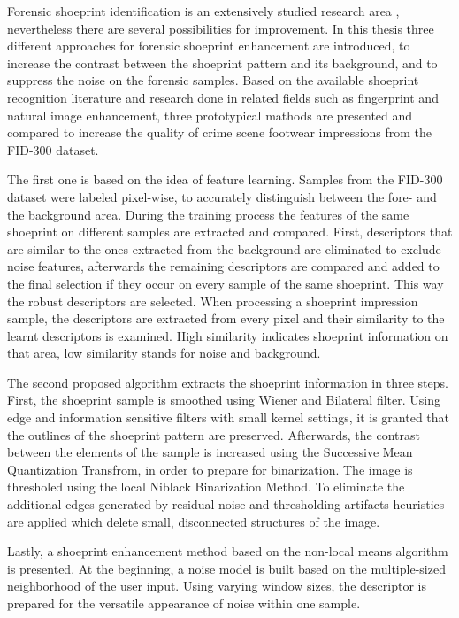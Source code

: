 \documentclass[draft,final]{vutinfth} %
\begin{document}
\par
Forensic shoeprint identification is an extensively studied research area \cite{rida2019forensic}, nevertheless there are several possibilities for improvement.
In this thesis three different approaches for forensic shoeprint enhancement are introduced, to increase the contrast between the shoeprint pattern and its background, and to suppress the noise on the forensic samples.
Based on the available shoeprint recognition literature and research done in related fields such as fingerprint and natural image enhancement, three prototypical mathods are presented and compared to increase the quality of crime scene footwear impressions from the FID-300 dataset.
\par
The first one is based on the idea of feature learning.
Samples from the FID-300 dataset were labeled pixel-wise, to accurately distinguish between the fore- and the background area.
During the training process the features of the same shoeprint on different samples are extracted and compared.
First, descriptors that are similar to the ones extracted from the background are eliminated to exclude noise features, afterwards the remaining descriptors are compared and added to the final selection if they occur on every sample of the same shoeprint.
This way the robust descriptors are selected.
When processing a shoeprint impression sample, the descriptors are extracted from every pixel and their similarity to the learnt descriptors is examined.
High similarity indicates shoeprint information on that area, low similarity stands for noise and background.
\par
The second proposed algorithm extracts the shoeprint information in three steps.
First, the shoeprint sample is smoothed using Wiener and Bilateral filter.
Using edge and information sensitive filters with small kernel settings, it is granted that the outlines of the shoeprint pattern are preserved.
Afterwards, the contrast between the elements of the sample is increased using the Successive Mean Quantization Transfrom, in order to prepare for binarization.
The image is thresholed using the local Niblack Binarization Method.
To eliminate the additional edges generated by residual noise and thresholding artifacts heuristics are applied which delete small, disconnected structures of the image.
\par
Lastly, a shoeprint enhancement method based on the non-local means algorithm is presented.
At the beginning, a noise model is built based on the multiple-sized neighborhood of the user input.
Using varying window sizes, the descriptor is prepared for the versatile appearance of noise within one sample.
\end{document}

